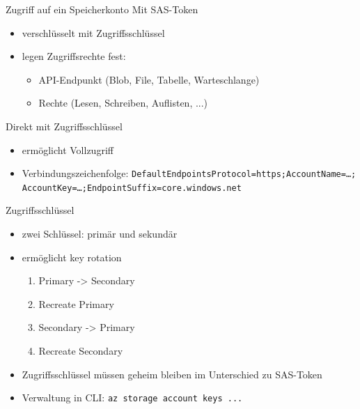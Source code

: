 \begin{flashcard}[Definition]{Zugriff auf ein Speicherkonto}
    Mit SAS-Token
    \begin{itemize}
        \item verschlüsselt mit Zugriffsschlüssel
        \item legen Zugriffsrechte fest:
        \begin{itemize}
            \item API-Endpunkt (Blob, File, Tabelle, Warteschlange)
            \item Rechte (Lesen, Schreiben, Auflisten, ...)
        \end{itemize}
    \end{itemize}

    Direkt mit Zugriffsschlüssel
    \begin{itemize}
        \item ermöglicht Vollzugriff
        \item Verbindungszeichenfolge:\newline
            \texttt{DefaultEndpointsProtocol=https;AccountName={\ldots};\\AccountKey={\ldots};EndpointSuffix=core.windows.net}
    \end{itemize}
\end{flashcard}

\begin{flashcard}[Definition]{Zugriffsschlüssel}
    \begin{itemize}
        \item zwei Schlüssel: primär und sekundär
        \item ermöglicht key rotation
            \begin{enumerate}
            \item Primary -> Secondary
            \item Recreate Primary
            \item Secondary -> Primary
            \item Recreate Secondary
            \end{enumerate}
        \item Zugriffsschlüssel müssen geheim bleiben\newline
            im Unterschied zu SAS-Token
        \item Verwaltung in CLI:\newline
            \texttt{az storage account keys ...}
    \end{itemize}
\end{flashcard}


